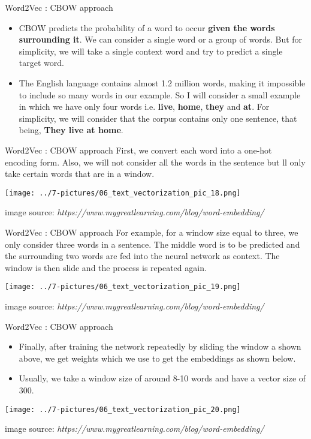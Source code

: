 \documentclass[11pt]{beamer}
\begin{document}
\begin{frame}{Word2Vec : CBOW approach}
	\begin{itemize}
		\item CBOW predicts the probability of a word to occur \textbf{given the words surrounding it}. We can consider a single word or a group of words. But for simplicity, we will take a single context word and try to predict a single target word.
		\item The English language contains almost 1.2 million words, making it impossible to include so many words in our example. So I will consider a small example in which we have only four words i.e. \textbf{live}, \textbf{home}, \textbf{they} and \textbf{at}. For simplicity, we will consider that the corpus contains only one sentence, that being, \textbf{They live at home}.
	\end{itemize}
\end{frame}
\begin{frame}{Word2Vec : CBOW approach}
	First, we convert each word into a one-hot encoding form. Also, we will not consider all the words in the sentence but ll only take certain words that are in a window. 
	\begin{center}
	\texttt{[image: ../7-pictures/06\_text\_vectorization\_pic\_18.png]}
	\end{center}
	\footnotesize{image source: \textit{https://www.mygreatlearning.com/blog/word-embedding/}}
\end{frame}
\begin{frame}{Word2Vec : CBOW approach}
	For example, for a window size equal to three, we only consider three words in a sentence. The middle word is to be predicted and the surrounding two words are fed into the neural network as context. The window is then slide and the process is repeated again.
	\begin{center}
	\texttt{[image: ../7-pictures/06\_text\_vectorization\_pic\_19.png]}
	\end{center}
	\footnotesize{image source: \textit{https://www.mygreatlearning.com/blog/word-embedding/}}
\end{frame}
\begin{frame}{Word2Vec : CBOW approach}
	\begin{itemize}
		\item Finally, after training the network repeatedly by sliding the window a shown above, we get weights which we use to get the embeddings as shown below.
		\item Usually, we take a window size of around 8-10 words and have a vector size of 300.
	\end{itemize}
	\begin{center}
	\texttt{[image: ../7-pictures/06\_text\_vectorization\_pic\_20.png]}
	\end{center}
	\footnotesize{image source: \textit{https://www.mygreatlearning.com/blog/word-embedding/}}
\end{frame}
\end{document}
